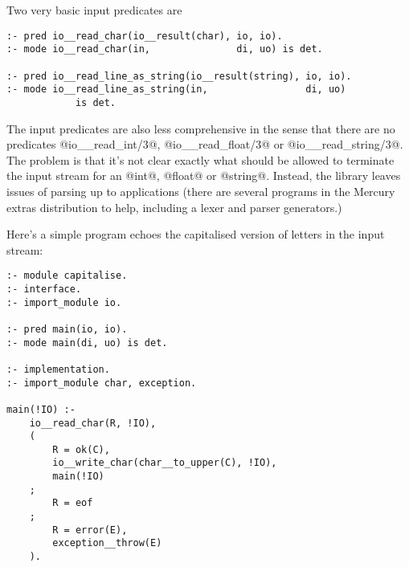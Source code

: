 Two very basic input predicates are
\begin{verbatim}
:- pred io__read_char(io__result(char), io, io).
:- mode io__read_char(in,               di, uo) is det.

:- pred io__read_line_as_string(io__result(string), io, io).
:- mode io__read_line_as_string(in,                 di, uo)
            is det.
\end{verbatim}

The input predicates are also less comprehensive in the
sense that there are no predicates @io__read_int/3@,
@io__read_float/3@ or @io__read_string/3@.  The problem is
that it's not clear exactly what should be allowed to
terminate the input stream for an @int@, @float@ or @string@.
Instead, the library leaves issues of parsing up to
applications (there are several programs in the Mercury
extras distribution to help, including a lexer and parser
generators.)

Here's a simple program echoes the capitalised version of
letters in the input stream:
\begin{verbatim}
:- module capitalise.
:- interface.
:- import_module io.

:- pred main(io, io).
:- mode main(di, uo) is det.

:- implementation.
:- import_module char, exception.

main(!IO) :-
    io__read_char(R, !IO),
    (
        R = ok(C),
        io__write_char(char__to_upper(C), !IO),
        main(!IO)
    ;
        R = eof
    ;
        R = error(E),
        exception__throw(E)
    ).
\end{verbatim}



